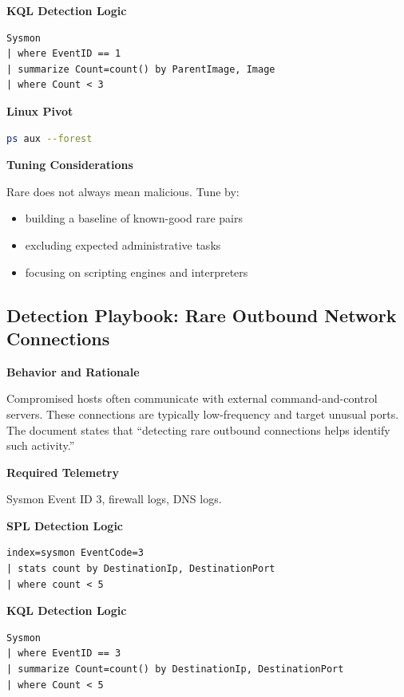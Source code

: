 \textbf{KQL Detection Logic}

\begin{lstlisting}
Sysmon
| where EventID == 1
| summarize Count=count() by ParentImage, Image
| where Count < 3
\end{lstlisting}

\textbf{Linux Pivot}

\begin{lstlisting}[language=bash]
ps aux --forest
\end{lstlisting}

\textbf{Tuning Considerations}

Rare does not always mean malicious. Tune by:

\begin{itemize}
    \item building a baseline of known-good rare pairs
    \item excluding expected administrative tasks
    \item focusing on scripting engines and interpreters
\end{itemize}


\subsection*{Detection Playbook: Rare Outbound Network Connections}

\textbf{Behavior and Rationale}

Compromised hosts often communicate with external command-and-control servers. These connections are typically low-frequency 
and target unusual ports. The document states that “detecting rare outbound connections helps identify such activity.” 

\textbf{Required Telemetry}

Sysmon Event ID 3, firewall logs, DNS logs.

\textbf{SPL Detection Logic}

\begin{lstlisting}
index=sysmon EventCode=3
| stats count by DestinationIp, DestinationPort
| where count < 5
\end{lstlisting}

\textbf{KQL Detection Logic}

\begin{lstlisting}
Sysmon
| where EventID == 3
| summarize Count=count() by DestinationIp, DestinationPort
| where Count < 5
\end{lstlisting}


